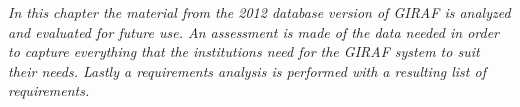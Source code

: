\emph{In this chapter the material from the 2012 database version of GIRAF is analyzed and evaluated for future use. An assessment is made of the data needed in order to capture everything that the institutions need for the GIRAF system to suit their needs. Lastly a requirements analysis is performed with a resulting list of requirements.}